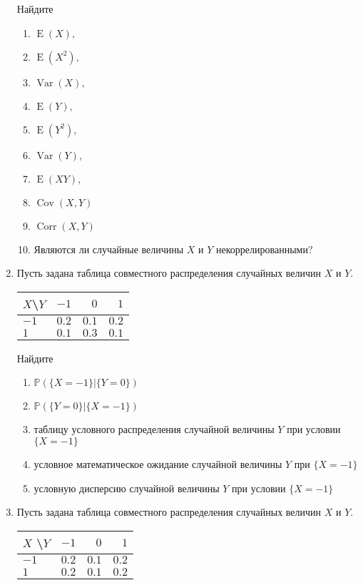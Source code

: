 \documentclass[12pt]{article}
\DeclareMathOperator{\Cov}{Cov}
\DeclareMathOperator{\Corr}{Corr}
\DeclareMathOperator{\Var}{Var}
\DeclareMathOperator{\E}{E}
\def \P{\mathbb{P}}
\begin{document}
\begin{enumerate}
Найдите
\begin{enumerate}
    \item $\E(X),$
    \item $\E(X^{2}),$
	\item $\Var(X),$
    \item $\E(Y),$
    \item $\E(Y^{2}),$
    \item $\Var(Y),$
    \item $\E(XY),$
	\item $\Cov(X,Y)$
    \item $\Corr(X,Y)$
    \item Являются ли случайные величины $X$ и $Y$ некоррелированными?
\end{enumerate}

\item
Пусть задана таблица совместного распределения случайных величин $X$ и $Y$.

\begin{center}\begin{tabular}{l|rrr}
\toprule
 $X$\textbackslash $Y$    & $-1$  & $0$   & $1$   \\ \midrule
$-1$                 & $0.2$ & $0.1$ & $0.2$ \\
 $1$                 & $0.1$ & $0.3$ & $0.1$ \\ \bottomrule
\end{tabular}\end{center}

Найдите
\begin{enumerate}
\item $\P(\{X = -1\} | \{Y = 0\})$
\item $\P(\{Y = 0\} | \{X = -1\})$
\item таблицу условного распределения случайной величины $Y$ при условии $\{X = -1\}$
\item условное математическое ожидание случайной величины $Y$ при $\{X = -1\}$
\item условную дисперсию случайной величины $Y$
при условии $\{X = -1\}$
\end{enumerate}

\item Пусть задана таблица совместного распределения случайных величин $X$ и $Y$.

\begin{center}\begin{tabular}{l|rrr}
\toprule
 $X$ \textbackslash $Y$    & $-1$  & $0$   & $1$   \\ \midrule
$-1$                 & $0.2$ & $0.1$ & $0.2$ \\
 $1$                 & $0.2$ & $0.1$ & $0.2$ \\ \bottomrule
\end{tabular}\end{center}


\end{enumerate}
\end{document}
